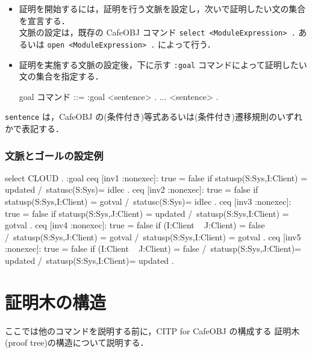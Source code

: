 \documentclass[a4paper,oneside,10pt,here]{memoir}
\newenvironment{vvtm}%
{\parskip=0pt\lineskip=0pt\begin{center}\begin{minipage}{0.8\textwidth}\begin{snugshade}}%
  {\end{snugshade}\end{minipage}\end{center}}
\begin{document}
\begin{itemize}
\item 証明を開始するには，証明を行う文脈を設定し，次いで証明したい文の集合を宣言する．\\
  文脈の設定は，既存の CafeOBJ コマンド \verb|select <ModuleExpression> .| あるいは \verb|open <ModuleExpression> .|
  によって行う．
\item 証明を実施する文脈の設定後，下に示す \verb|:goal| コマンドによって証明したい文の集合を指定する．\\
  \begin{vvtm}
    \begin{simplev}
    goal コマンド ::= :goal { <sentence> .  ...  <sentence> . }      
    \end{simplev}
  \end{vvtm}
\end{itemize}
\verb|sentence| は，CafeOBJ の(条件付き)等式あるいは(条件付き)遷移規則のいずれかで表記する．


\subsubsection{文脈とゴールの設定例}
  \begin{examplev}
 select CLOUD . 
 :goal {
  ceq [inv1 :nonexec]: true = false if statusp(S:Sys,I:Client) = updated /\
                                        statusc(S:Sys)= idlec .
  ceq [inv2 :nonexec]: true = false if statusp(S:Sys,I:Client) = gotval /\ 
                                       statusc(S:Sys)= idlec .
  ceq [inv3 :nonexec]: true = false if statusp(S:Sys,J:Client) = updated /\
                                       statusp(S:Sys,I:Client) = gotval .
  ceq [inv4 :nonexec]: true = false if (I:Client ~ J:Client) = false /\
                                       statusp(S:Sys,J:Client) = gotval /\ 
                                       statusp(S:Sys,I:Client) = gotval .
  ceq [inv5 :nonexec]: true = false if (I:Client ~ J:Client) = false /\
       statusp(S:Sys,J:Client)= updated /\ statusp(S:Sys,I:Client)= updated .}
  \end{examplev}

\section{証明木の構造}\label{sec:proof-struct}
ここでは他のコマンドを説明する前に，CITP for CafeOBJ の構成する
証明木(proof tree)の構造について説明する．
\end{document}
